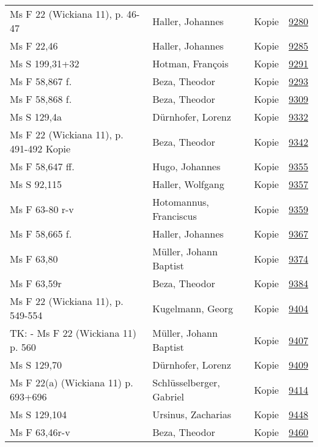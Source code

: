 \documentclass[10pt,a4paper,landscape]{report}
\begin{document}
\begin{longtable}{p{16cm}p{4cm}lr}
Ms F 22 (Wickiana 11), p. 46-47	&	Haller, Johannes	&	Kopie	&	\href{http://130.60.24.72/assignment/9280}{9280}\\
Ms F 22,46	&	Haller, Johannes	&	Kopie	&	\href{http://130.60.24.72/assignment/9285}{9285}\\
Ms S 199,31+32	&	Hotman, François	&	Kopie	&	\href{http://130.60.24.72/assignment/9291}{9291}\\
Ms F 58,867 f.	&	Beza, Theodor	&	Kopie	&	\href{http://130.60.24.72/assignment/9293}{9293}\\
Ms F 58,868 f.	&	Beza, Theodor	&	Kopie	&	\href{http://130.60.24.72/assignment/9309}{9309}\\
Ms S 129,4a	&	Dürnhofer, Lorenz	&	Kopie	&	\href{http://130.60.24.72/assignment/9332}{9332}\\
Ms F 22 (Wickiana 11), p. 491-492 Kopie	&	Beza, Theodor	&	Kopie	&	\href{http://130.60.24.72/assignment/9342}{9342}\\
Ms F 58,647 ff.	&	Hugo, Johannes	&	Kopie	&	\href{http://130.60.24.72/assignment/9355}{9355}\\
Ms S 92,115	&	Haller, Wolfgang	&	Kopie	&	\href{http://130.60.24.72/assignment/9357}{9357}\\
Ms F 63-80 r-v	&	Hotomannus, Franciscus	&	Kopie	&	\href{http://130.60.24.72/assignment/9359}{9359}\\
Ms F 58,665 f.	&	Haller, Johannes	&	Kopie	&	\href{http://130.60.24.72/assignment/9367}{9367}\\
Ms F 63,80	&	Müller, Johann Baptist	&	Kopie	&	\href{http://130.60.24.72/assignment/9374}{9374}\\
Ms F 63,59r	&	Beza, Theodor	&	Kopie	&	\href{http://130.60.24.72/assignment/9384}{9384}\\
Ms F 22 (Wickiana 11), p. 549-554	&	Kugelmann, Georg	&	Kopie	&	\href{http://130.60.24.72/assignment/9404}{9404}\\
TK: - Ms F 22 (Wickiana 11) p. 560	&	Müller, Johann Baptist	&	Kopie	&	\href{http://130.60.24.72/assignment/9407}{9407}\\
Ms S 129,70	&	Dürnhofer, Lorenz	&	Kopie	&	\href{http://130.60.24.72/assignment/9409}{9409}\\
Ms F 22(a) (Wickiana 11) p. 693+696	&	Schlüsselberger, Gabriel	&	Kopie	&	\href{http://130.60.24.72/assignment/9414}{9414}\\
Ms S 129,104	&	Ursinus, Zacharias	&	Kopie	&	\href{http://130.60.24.72/assignment/9448}{9448}\\
Ms F 63,46r-v	&	Beza, Theodor	&	Kopie	&	\href{http://130.60.24.72/assignment/9460}{9460}\\

\end{longtable}
\end{document}
